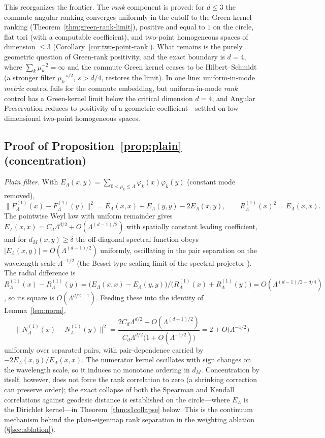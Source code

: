 \documentclass[11pt]{article}
\theoremstyle{remark}
\begin{document}
\noindent This reorganizes the frontier. The \emph{rank} component is proved: for
$d\le3$ the commute angular ranking converges uniformly in the cutoff to the Green-kernel
ranking (Theorem~\ref{thm:green-rank-limit}), positive and equal to $1$ on the circle,
flat tori (with a computable coefficient), and two-point homogeneous spaces of dimension
$\le3$ (Corollary~\ref{cor:two-point-rank}). What remains is the purely geometric
question of Green-rank positivity, and the exact boundary is $d=4$, where
$\sum_k\mu_k^{-2}=\infty$ and the commute Green kernel ceases to be Hilbert--Schmidt (a
stronger filter $\mu_k^{-s/2}$, $s>d/4$, restores the limit). In one line: uniform-in-mode
\emph{metric} control fails for the commute embedding, but uniform-in-mode \emph{rank}
control has a Green-kernel limit below the critical dimension $d=4$, and Angular
Preservation reduces to positivity of a geometric coefficient---settled on
low-dimensional two-point homogeneous spaces.


\subsection*{Proof of Proposition~\ref{prop:plain} (concentration)}
\emph{Plain filter.} With $E_\Lambda(x,y)=\sum_{0<\mu_k\le\Lambda}
\varphi_k(x)\varphi_k(y)$ (constant mode removed),
\[
\big\lVert F^{(1)}_\Lambda(x)-F^{(1)}_\Lambda(y)\big\rVert^2
=E_\Lambda(x,x)+E_\Lambda(y,y)-2E_\Lambda(x,y),
\qquad R^{(1)}_\Lambda(x)^2=E_\Lambda(x,x).
\]
The pointwise Weyl law with uniform remainder \cite{hormander1968} gives
$E_\Lambda(x,x)=C_d\Lambda^{d/2}+O(\Lambda^{(d-1)/2})$ with spatially constant
leading coefficient, and for $d_M(x,y)\ge\delta$ the off-diagonal spectral
function obeys $\lvert E_\Lambda(x,y)\rvert=O(\Lambda^{(d-1)/2})$ uniformly,
oscillating in the pair separation on the wavelength scale $\Lambda^{-1/2}$
(the Bessel-type scaling limit of the spectral projector
\cite{canzanihanin2015}). The radial difference is
$R^{(1)}_\Lambda(x)-R^{(1)}_\Lambda(y)
=\big(E_\Lambda(x,x)-E_\Lambda(y,y)\big)/\big(R^{(1)}_\Lambda(x)+R^{(1)}_\Lambda(y)\big)
=O(\Lambda^{(d-1)/2-d/4})$, so its square is $O(\Lambda^{d/2-1})$. Feeding
these into the identity of Lemma~\ref{lem:norm},
\[
\big\lVert N^{(1)}_\Lambda(x)-N^{(1)}_\Lambda(y)\big\rVert^2
=\frac{2C_d\Lambda^{d/2}+O(\Lambda^{(d-1)/2})}
{C_d\Lambda^{d/2}\big(1+O(\Lambda^{-1/2})\big)}
=2+O\big(\Lambda^{-1/2}\big)
\]
uniformly over separated pairs, with pair-dependence carried by
$-2E_\Lambda(x,y)/E_\Lambda(x,x)$. The numerator kernel oscillates with sign
changes on the wavelength scale, so it induces no monotone ordering in $d_M$.
Concentration by itself, however, does not force the rank correlation to zero
(a shrinking correction can preserve order); the exact collapse of both the
Spearman and Kendall correlations against geodesic distance is established on the
circle---where $E_\Lambda$ is the Dirichlet kernel---in
Theorem~\ref{thm:s1collapse} below. This is the continuum mechanism behind the
plain-eigenmap rank separation in the weighting ablation (\S\ref{sec:ablation}).
\end{document}
